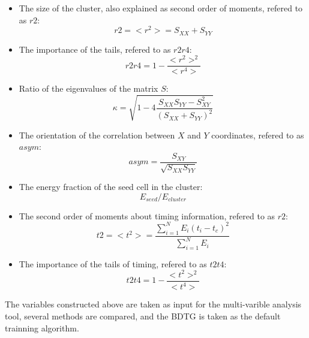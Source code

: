 \begin{itemize}

\item The size of the cluster, also explained as second order of moments, refered to as $r2$:
\begin{equation}
   r2 = <r^2> = S_{XX} + S_{YY}
\end{equation}

\item The importance of the tails, refered to as $r2r4$:
\begin{equation}
   r2r4 = 1- \frac{ <r^2>^2 }{ <r^4> }
\end{equation}

\item Ratio of the eigenvalues of the matrix $S$:   
\begin{equation}
   \kappa = \sqrt{ 1-4\frac{S_{XX}S_{YY}-S^2_{XY}} {(S_{XX}+S_{YY})^2} } 
\end{equation}

\item The orientation of the correlation between $X$ and $Y$ coordinates, refered to as $asym$:
\begin{equation}
   asym = \frac{S_{XY}}{\sqrt{S_{XX}S_{YY}}}
\end{equation}

\item The energy fraction of the seed cell in the cluster:
\begin{equation}
   E_{seed} \slash E_{cluster}
\end{equation}

\item The second order of moments about timing information, refered to as $r2$:
\begin{equation}
   t2 = <t^2> = \frac{\sum_{i=1}^{N}E_{i}(t_{i}-t_{c})^2}{\sum_{i=1}^{N}E_{i}} 
\end{equation}

\item The importance of the tails of timing, refered to as $t2t4$:
\begin{equation}
   t2t4 = 1- \frac{ <t^2>^2 }{ <t^4> } 
\end{equation}

\end{itemize}

The variables constructed above are taken as input for the multi-varible analysis tool,
several methods are compared, 
and the BDTG is taken as the default trainning algorithm.



